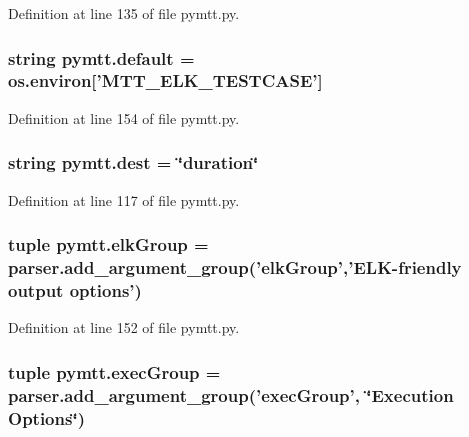Definition at line 135 of file pymtt.\-py.

\hypertarget{namespacepymtt_ae5dcbc541ed4eb4b84f0b2a82e858395}{
\subsubsection[{default}]{\setlength{\rightskip}{0pt plus 5cm}string pymtt.\-default = os.\-environ\mbox{[}'M\-T\-T\-\_\-\-E\-L\-K\-\_\-\-T\-E\-S\-T\-C\-A\-S\-E'\mbox{]}}}\label{namespacepymtt_ae5dcbc541ed4eb4b84f0b2a82e858395}


Definition at line 154 of file pymtt.\-py.

\hypertarget{namespacepymtt_a9ecea46ee6082edb9bbdd8393829e18e}{
\subsubsection[{dest}]{\setlength{\rightskip}{0pt plus 5cm}string pymtt.\-dest = \char`\"{}duration\char`\"{}}}\label{namespacepymtt_a9ecea46ee6082edb9bbdd8393829e18e}


Definition at line 117 of file pymtt.\-py.

\hypertarget{namespacepymtt_aace1bea66474191731e447b6d89fe82b}{
\subsubsection[{elk\-Group}]{\setlength{\rightskip}{0pt plus 5cm}tuple pymtt.\-elk\-Group = parser.\-add\-\_\-argument\-\_\-group('elk\-Group','E\-L\-K-\/friendly output options')}}\label{namespacepymtt_aace1bea66474191731e447b6d89fe82b}


Definition at line 152 of file pymtt.\-py.

\hypertarget{namespacepymtt_a0f52dbd5d46583e466305a708dea64a1}{
\subsubsection[{exec\-Group}]{\setlength{\rightskip}{0pt plus 5cm}tuple pymtt.\-exec\-Group = parser.\-add\-\_\-argument\-\_\-group('exec\-Group', \char`\"{}Execution Options\char`\"{})}}\label{namespacepymtt_a0f52dbd5d46583e466305a708dea64a1}


